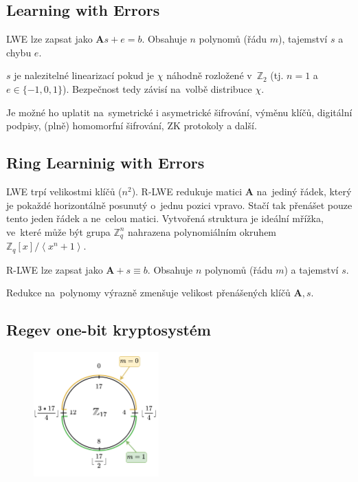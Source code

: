 \subsection{Learning with Errors}

LWE lze zapsat jako $\textbf{A}s + e = b$. Obsahuje $n$ polynomů (řádu $m$), tajemství $s$ a chybu $e$.

$s$ je nalezitelné linearizací pokud je $\chi$ náhodně rozložené v~$\mathbb{Z}_2$ (tj. $n=1$ a $e \in \{-1, 0, 1\}$).
Bezpečnost tedy závisí na~volbě distribuce $\chi$.

Je možné ho uplatit na~symetrické i asymetrické šifrování, výměnu klíčů, digitální podpisy, (plně) homomorfní šifrování, ZK protokoly a další.

\subsection{Ring Learninig with Errors}

LWE trpí velikostmi klíčů ($n^2$).
R-LWE redukuje matici \textbf{A} na~jediný řádek, který je pokaždé horizontálně posunutý o~jednu pozici vpravo.
Stačí tak přenášet pouze tento jeden řádek a ne~celou matici.
Vytvořená struktura je ideální mřížka, ve~které může být grupa $\mathbb{Z}_q^n$ nahrazena polynomiálním okruhem $\mathbb{Z}_q[x]/\left<x^n+1\right>$.

R-LWE lze zapsat jako $\textbf{A} + s \equiv b$. Obsahuje $n$ polynomů (řádu $m$) a tajemství $s$.

Redukce na~polynomy výrazně zmenšuje velikost přenášených klíčů $\textbf{A}, s$.

\subsection{Regev one-bit kryptosystém}

\begin{figure}
    \centering
    \includegraphics[width=13em]{regev}
\end{figure}

